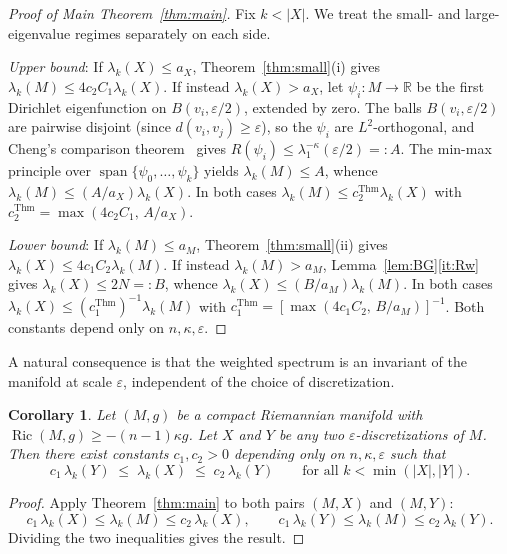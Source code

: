 \documentclass[10pt,reqno]{amsart}
\newtheorem{corollary}[theorem]{Corollary}
\theoremstyle{remark}
\newcommand{\R}{\mathbb{R}}
\newcommand{\Ric}{\operatorname{Ric}}
\begin{document}
\begin{proof}[Proof of Main Theorem~\ref{thm:main}] Fix $k<|X|$. We treat the small- and large-eigenvalue regimes separately on each side.
\par
\emph{Upper bound}: If $\lambda_k(X)\leq a_X$, Theorem~\ref{thm:small}(i) gives $\lambda_k(M)\leq 4c_2C_1\lambda_k(X)$. If instead $\lambda_k(X)>a_X$, let $\psi_i:M\to\R$ be the first Dirichlet eigenfunction on $B(v_i,\varepsilon/2)$, extended by zero. The balls $B(v_i,\varepsilon/2)$ are pairwise disjoint (since $d(v_i,v_j)\geq\varepsilon$), so the $\psi_i$ are $L^2$-orthogonal, and Cheng's comparison theorem~\cite{Cheng1975} gives $R(\psi_i)\leq\lambda_1^{-\kappa}(\varepsilon/2)=:A$. The min-max principle over $\operatorname{span}\{\psi_0,\ldots,\psi_k\}$ yields $\lambda_k(M)\leq A$, whence $\lambda_k(M)\leq(A/a_X)\lambda_k(X)$. In both cases $\lambda_k(M)\leq c_2^{\mathrm{Thm}}\lambda_k(X)$ with $c_2^{\mathrm{Thm}}=\max(4c_2C_1,\,A/a_X)$. 
\par
\emph{Lower bound}: If $\lambda_k(M)\leq a_M$, Theorem~\ref{thm:small}(ii) gives $\lambda_k(X)\leq 4c_1C_2\lambda_k(M)$. If instead $\lambda_k(M)>a_M$, Lemma~\ref{lem:BG}\ref{it:Rw} gives $\lambda_k(X)\leq 2N=:B$, whence $\lambda_k(X)\leq(B/a_M)\lambda_k(M)$. In both cases $\lambda_k(X)\leq(c_1^{\mathrm{Thm}})^{-1}\lambda_k(M)$ with $c_1^{\mathrm{Thm}}=[\max(4c_1C_2,\,B/a_M)]^{-1}$. Both constants depend only on $n,\kappa,\varepsilon$. \end{proof}


A natural consequence is that the weighted spectrum is an invariant of
the manifold at scale $\varepsilon$, independent of the choice of
discretization.

\begin{corollary}
\label{cor:independence}
Let $(M,g)$ be a compact Riemannian manifold with
$\Ric(M,g)\geq-(n-1)\kappa g$.
Let $X$ and $Y$ be any two $\varepsilon$-discretizations of $M$.
Then there exist constants $c_1,c_2>0$ depending only on
$n,\kappa,\varepsilon$ such that
\[
  c_1\,\lambda_k(Y)\;\leq\;\lambda_k(X)\;\leq\; c_2\,\lambda_k(Y)
  \qquad\text{for all }k<\min(|X|,|Y|).
\]
\end{corollary}

\begin{proof}
Apply Theorem~\ref{thm:main} to both pairs $(M,X)$ and $(M,Y)$:
\[
  c_1\,\lambda_k(X)\leq\lambda_k(M)\leq c_2\,\lambda_k(X),
  \qquad
  c_1\,\lambda_k(Y)\leq\lambda_k(M)\leq c_2\,\lambda_k(Y).
\]
Dividing the two inequalities gives the result.
\end{proof}
\end{document}
